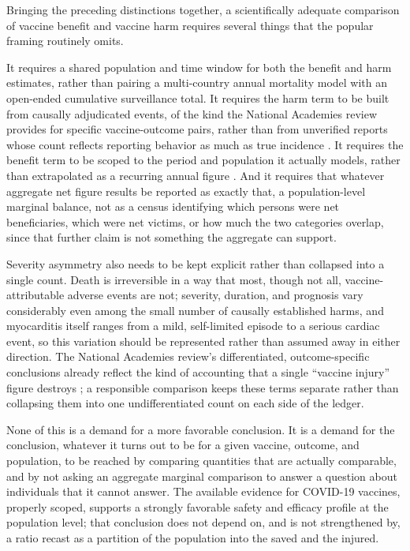\documentclass[11pt]{article}
\begin{document}
Bringing the preceding distinctions together, a scientifically adequate comparison of vaccine benefit and vaccine harm requires several things that the popular framing routinely omits.

It requires a shared population and time window for both the benefit and harm estimates, rather than pairing a multi-country annual mortality model with an open-ended cumulative surveillance total. It requires the harm term to be built from causally adjudicated events, of the kind the National Academies review provides for specific vaccine-outcome pairs, rather than from unverified reports whose count reflects reporting behavior as much as true incidence \citep{nasem2024}. It requires the benefit term to be scoped to the period and population it actually models, rather than extrapolated as a recurring annual figure \citep{watson2022}. And it requires that whatever aggregate net figure results be reported as exactly that, a population-level marginal balance, not as a census identifying which persons were net beneficiaries, which were net victims, or how much the two categories overlap, since that further claim is not something the aggregate can support.

Severity asymmetry also needs to be kept explicit rather than collapsed into a single count. Death is irreversible in a way that most, though not all, vaccine-attributable adverse events are not; severity, duration, and prognosis vary considerably even among the small number of causally established harms, and myocarditis itself ranges from a mild, self-limited episode to a serious cardiac event, so this variation should be represented rather than assumed away in either direction. The National Academies review's differentiated, outcome-specific conclusions already reflect the kind of accounting that a single ``vaccine injury'' figure destroys \citep{nasem2024}; a responsible comparison keeps these terms separate rather than collapsing them into one undifferentiated count on each side of the ledger.

None of this is a demand for a more favorable conclusion. It is a demand for the conclusion, whatever it turns out to be for a given vaccine, outcome, and population, to be reached by comparing quantities that are actually comparable, and by not asking an aggregate marginal comparison to answer a question about individuals that it cannot answer. The available evidence for COVID-19 vaccines, properly scoped, supports a strongly favorable safety and efficacy profile at the population level; that conclusion does not depend on, and is not strengthened by, a ratio recast as a partition of the population into the saved and the injured.
\end{document}

